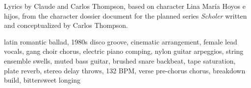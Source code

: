 
\begin{notes}
Lyrics by Claude and Carlos Thompson, based on character Lina María Hoyos e hijos, %
from the character dossier document for the planned series \emph{Scholer} %
written and conceptualized by Carlos Thompson.
\end{notes}
\begin{style}
latin romantic ballad, 1980s disco groove, cinematic arrangement, female lead vocals, gang choir chorus, electric piano comping, nylon guitar arpeggios, string ensemble swells, muted bass guitar, brushed snare backbeat, tape saturation, plate reverb, stereo delay throws, 132 BPM, verse pre-chorus chorus, breakdown build, bittersweet longing
\end{style}
